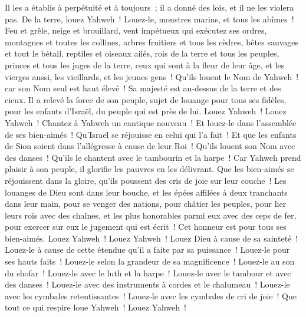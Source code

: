 \begin{multicols}{2}
Il les a établis à perpétuité et à toujours~; il a donné des lois, et il ne les violera pas.
De la terre, louez Yahweh~! Louez-le, monstres marins, et tous les abîmes~!
Feu et grêle, neige et brouillard, vent impétueux qui exécutez ses ordres,
montagnes et toutes les collines, arbres fruitiers et tous les cèdres,
bêtes sauvages et tout le bétail, reptiles et oiseaux ailés,
rois de la terre et tous les peuples, princes et tous les juges de la terre,
ceux qui sont à la fleur de leur âge, et les vierges aussi, les vieillards, et les jeunes gens~!
Qu'ils louent le Nom de Yahweh~! car son Nom seul est haut élevé~! Sa majesté est au-dessus de la terre et des cieux.
Il a relevé la force de son peuple, sujet de louange pour tous ses fidèles, pour les enfants d'Israël, du peuple qui est près de lui. Louez Yahweh~!
\VerseOne{}Louez Yahweh~! Chantez à Yahweh un cantique nouveau~! Et louez-le dans l'assemblée de ses bien-aimés~!
Qu'Israël se réjouisse en celui qui l'a fait~! Et que les enfants de Sion soient dans l'allégresse à cause de leur Roi~!
Qu'ils louent son Nom avec des danses~! Qu'ils le chantent avec le tambourin et la harpe~!
Car Yahweh prend plaisir à son peuple, il glorifie les pauvres en les délivrant.
Que les bien-aimés se réjouissent dans la gloire, qu'ils poussent des cris de joie sur leur couche~!
Les louanges de Dieu sont dans leur bouche, et les épées affilées à deux tranchants dans leur main,
pour se venger des nations, pour châtier les peuples,
pour lier leurs rois avec des chaînes, et les plus honorables parmi eux avec des ceps de fer,
pour exercer sur eux le jugement qui est écrit~! Cet honneur est pour tous ses bien-aimés. Louez Yahweh~!
\VerseOne{}Louez Yahweh~! Louez Dieu à cause de sa sainteté~! Louez-le à cause de cette étendue qu'il a faite par sa puissance~!
Louez-le pour ses hauts faits~! Louez-le selon la grandeur de sa magnificence~!
Louez-le au son du shofar~! Louez-le avec le luth et la harpe~!
Louez-le avec le tambour et avec des danses~! Louez-le avec des instruments à cordes et le chalumeau~!
Louez-le avec les cymbales retentissantes~! Louez-le avec les cymbales de cri de joie~!
Que tout ce qui respire loue Yahweh~! Louez Yahweh~!
\PPE{}
\end{multicols}
